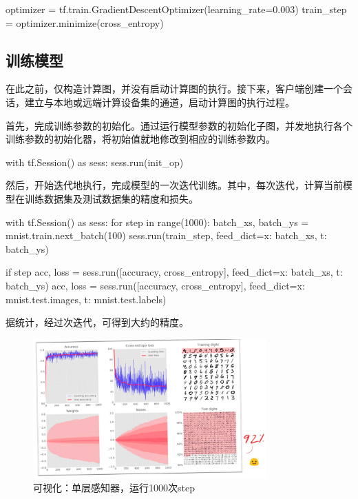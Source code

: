 \begin{content}
\begin{leftbar}
\begin{python}
optimizer = tf.train.GradientDescentOptimizer(learning_rate=0.003)
train_step = optimizer.minimize(cross_entropy)
\end{python}
\end{leftbar}

\subsection{训练模型}

在此之前，\tf{}仅构造计算图，并没有启动计算图的执行。接下来，客户端创建一个会话，建立与本地或远端计算设备集的通道，启动计算图的执行过程。

首先，完成训练参数的初始化。通过运行模型参数的初始化子图，并发地执行各个训练参数的初始化器，将初始值就地修改到相应的训练参数内。

\begin{leftbar}
\begin{python}
with tf.Session() as sess:
  sess.run(init_op)
\end{python}
\end{leftbar}

然后，开始迭代地执行，完成模型的一次迭代训练。其中，每次迭代，计算当前模型在训练数据集及测试数据集的精度和损失。

\begin{leftbar}
\begin{python}
with tf.Session() as sess:
  for step in range(1000):
    batch_xs, batch_ys = mnist.train.next_batch(100)        
    sess.run(train_step, feed_dict={x: batch_xs, t: batch_ys})
    
    if step %
      acc, loss = sess.run([accuracy, cross_entropy], 
        feed_dict={x: batch_xs, t: batch_ys})
      acc, loss = sess.run([accuracy, cross_entropy], 
        feed_dict={x: mnist.test.images, t: mnist.test.labels}) 
\end{python}
\end{leftbar}

据统计，经过次迭代，可得到大约的精度。

\begin{figure}[H]
\centering
\includegraphics[width=0.8\textwidth]{figures/mnist-slp-accuracy.png}
\caption{可视化：单层感知器，运行1000次step}
 \label{fig:mnist-slp-accuracy}
\end{figure}

\end{content}
